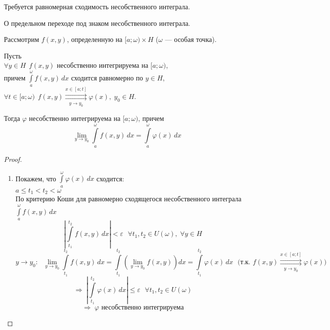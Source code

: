 \begin{properties}
\begin{enumerate}
        Требуется равномерная сходимость несобственного интеграла.
        
        \begin{theorem*} О предельном переходе под знаком несобственного интеграла.
        
            Рассмотрим $f(x, y)$, определенную на $[a; \omega) \times H$ ($\omega$ --- особая точка).
            
            Пусть \\
            \phantom{Пусть} $\forall y \in H \ \ f(x, y)$ несобственно интегрируема на $[a; \omega)$, \\
            \phantom{Пусть} причем $\int\limits_{a}^{\omega} f(x, y)\,dx$ сходится равномерно по $y \in H$, \\
            \phantom{Пусть} $\forall t \in [a; \omega) \ \ 
            f(x, y) \overset{x \in [a; t]}{\underset{y \to y_0}{\rightrightarrows}} \varphi(x), \; y_0 \in H$.
            
            Тогда $\varphi$ несобственно интегрируема на $[a; \omega)$, причем 
            \[ \lim_{y \to y_0} \int\limits_{a}^{\omega} f(x, y)\,dx = \int\limits_{a}^{\omega} \varphi(x)\,dx \]
        \end{theorem*}
        \begin{proof}
        \begin{enumerate}
            \item Покажем, что $\int\limits_{a}^{\omega} \varphi(x)\,dx$ сходится: \\[5 pt]
            $a \le t_1 < t_2 < \omega$ \\[3 pt]
            По критерию Коши для равномерно сходящегося несобственного интеграла $\int\limits_{a}^{\omega} f(x, y)\,dx$
            \[ \left| \int\limits_{t_1}^{t_2} f(x, y)\,dx \right| < \varepsilon \ \ \ \forall t_1, t_2 \in U(\omega), \; \forall y \in H \]
            \[ y \to y_0: \ \ \ \lim_{y \to y_0} \int\limits_{t_1}^{t_2} f(x, y)\,dx = 
            \int\limits_{t_1}^{t_2} \left( \lim_{y \to y_0} f(x, y) \right) dx = \int\limits_{t_1}^{t_2} \varphi(x)\,dx \ \ \ 
            \text{(т.к. $f(x, y) \overset{x \in [a; t]}{\underset{y \to y_0}{\rightrightarrows}} \varphi(x)$)} \]
            \[ \Rightarrow\; \left| \int\limits_{t_1}^{t_2} \varphi(x)\,dx \right| \le \varepsilon \ \ \ \forall t_1, t_2 \in U(\omega) \]
            \[ \Rightarrow\; \varphi \text{ несобственно интегрируема} \]
            

\end{enumerate}
\end{proof}
\end{enumerate}
\end{properties}
